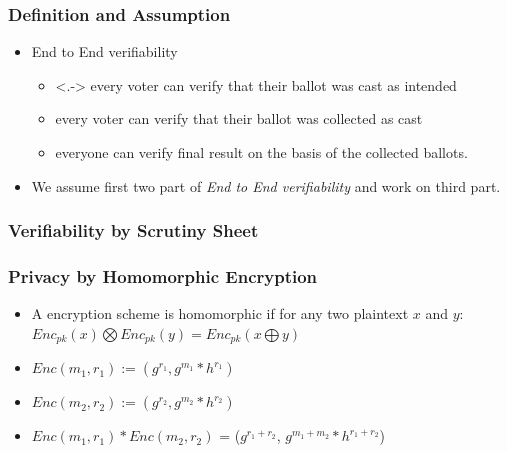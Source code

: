 \documentclass{beamer}
\begin{document}
\begin{frame}
\frametitle{Definition and Assumption}
\begin{itemize}
\item End to End verifiability
\begin{itemize}
  \item<.-> every voter can verify that their ballot was cast as
  intended
  \item every voter can verify that their ballot was collected as
  cast
  \item everyone can verify final result on the basis of the
  collected ballots.
\end{itemize}

\item We assume first two part of \textit{End to End verifiability} and work on
      third part.
\end{itemize}
\end{frame}



\begin{frame}
\frametitle{Verifiability by Scrutiny Sheet}
\lstnineth
\end{frame}


\begin{frame}
\frametitle{Privacy by Homomorphic Encryption}
\begin{itemize}
\item A encryption scheme is homomorphic if for any two plaintext $x$ and $y$:
$Enc_{pk}(x) \bigotimes Enc_{pk}(y) = Enc_{pk} (x \bigoplus y)$
\item $Enc(m_{1}, r_{1}) := (g^{r_{1}}, g^{m_{1}} *  h^{r_{1}})$ 
\item $Enc(m_{2}, r_{2}) := (g^{r_{2}}, g^{m_{2}} *  h^{r_{2}})$
\item  $Enc(m_{1}, r_{1})  * Enc(m_{2}, r_{2}) $ =  ($g^{r_{1} + r_{2}}$, $g^{m_{1} + m_{2}} * h^{r_{1} + r_{2}}$) 		
		
\end{itemize}
\end{frame}
\end{document}
